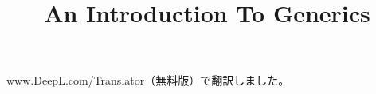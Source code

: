 \documentclass{jsarticle}
\title{An Introduction To Generics}
\begin{document}
\maketitle

www.DeepL.com/Translator（無料版）で翻訳しました。


\end{document}
